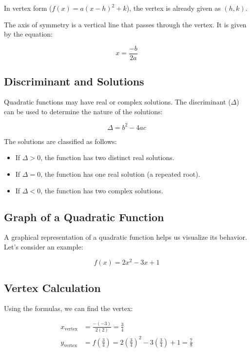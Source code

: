 \documentclass[12pt,a4paper]{article}
\begin{document}
In vertex form ($f(x) = a(x - h)^2 + k$), the vertex is already given as $(h, k)$.

The axis of symmetry is a vertical line that passes through the vertex. It is given by the equation:

\begin{equation}
x = \frac{-b}{2a}
\end{equation}

\subsection{Discriminant and Solutions}

Quadratic functions may have real or complex solutions. The discriminant ($\Delta$) can be used to determine the nature of the solutions:

\begin{equation}
\Delta = b^2 - 4ac
\end{equation}

The solutions are classified as follows:

\begin{itemize}
    \item If $\Delta > 0$, the function has two distinct real solutions.
    \item If $\Delta = 0$, the function has one real solution (a repeated root).
    \item If $\Delta < 0$, the function has two complex solutions.
\end{itemize}
\subsection{Graph of a Quadratic Function}

A graphical representation of a quadratic function helps us visualize its behavior. Let's consider an example:

\begin{equation}
f(x) = 2x^2 - 3x + 1
\end{equation}

\subsection{Vertex Calculation}

Using the formulas, we can find the vertex:

\begin{align*}
x_{\text{vertex}} &= \frac{-(-3)}{2(2)} = \frac{3}{4} \\
y_{\text{vertex}} &= f\left(\frac{3}{4}\right) = 2\left(\frac{3}{4}\right)^2 - 3\left(\frac{3}{4}\right) + 1 = \frac{7}{8}
\end{align*}
\end{document}
